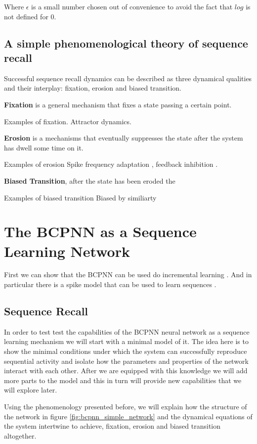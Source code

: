 \documentclass[10pt,a4paper]{article}
\begin{document}
Where $\epsilon$ is a small number chosen out of convenience to avoid the fact that $log$ is not defined for $0$. 
 

\subsection{A simple phenomenological theory of sequence recall}
Successful sequence recall dynamics can be described as three dynamical qualities and their interplay: fixation, erosion and biased transition. 

\textbf{Fixation} is a general mechanism that fixes a state passing a certain point.

Examples of fixation. Attractor dynamics.

\textbf{Erosion} is a mechanisms that eventually suppresses the state after the system has dwell some time on it. 

Examples of erosion 
Spike frequency adaptation \cite{roach2016memory}, feedback inhibition \cite{recanatesi2017memory}. 

\textbf{Biased Transition}, after the state has been eroded the 

Examples of biased transition
Biased by similiarty \cite{recanatesi2017memory}


\section{The BCPNN as a Sequence Learning Network}
First we can show that the BCPNN can be used do incremental learning \cite{sandberg2002bayesian}. And in particular there is a spike model that can be used to learn sequences \cite{tully2016spike}. 

\subsection{Sequence Recall}
In order to test test the capabilities of the BCPNN neural network as a sequence learning mechanism we will start with a minimal model of it. The idea here is to show the minimal conditions under which the system can successfully reproduce sequential activity and isolate how the parameters and properties of the network interact with each other. After we are equipped with this knowledge we will add more parts to the model and this in turn will provide new capabilities that we will explore later. 

Using the phenomenology presented before, we will explain how the structure of the network in figure \ref{fig:bcpnn_simple_network} and the dynamical equations of the system intertwine to achieve, fixation, erosion and biased transition altogether. 
\end{document}
